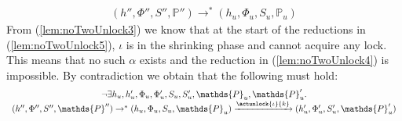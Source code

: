 \begin{lem}
	\begin{gather}
		\label{lem:noTwoUnlock5}
		(h'', \Phi'', S'', \mathds{P}'') \rightarrow^* (h_u, \Phi_u, S_u, \mathds{P}_u)
	\end{gather}
	From (\ref{lem:noTwoUnlock3}) we know that at the start of the reductions in (\ref{lem:noTwoUnlock5}), $\iota$ is in the shrinking phase and cannot acquire any lock. This means that no such $\alpha$ exists and the reduction in (\ref{lem:noTwoUnlock4}) is impossible. By contradiction we obtain that the following must hold:
	\[
		\begin{array}{c}
			\lnot \exists h_u, h_u', \Phi_u, \Phi_u', S_u, S_u', \mathds{P}_u, \mathds{P}_u'
				\ldotp \\
			(h'', \Phi'', S'', \mathds{P}'')
				\rightarrow^*
			(h_u, \Phi_u, S_u, \mathds{P}_u)
				\xrightarrow{\actunlock{\iota}{k}}
			(h_u', \Phi_u', S_u', \mathds{P}_u')
		\end{array}
	\]
\end{lem}

